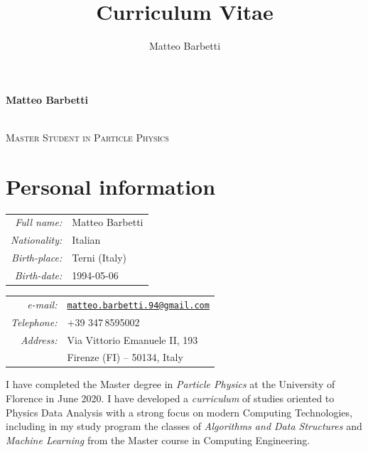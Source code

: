 \documentclass[a4, 11pt]{report}
\author{Matteo Barbetti}
\title{Curriculum Vitae}
\newcommand{\mail}[1]{\href{mailto:#1}{\texttt{#1}}}
\begin{document}
    \begin{center}
        \begin{Large}
            \textbf{Matteo Barbetti}
        \end{Large}\\[1mm]
        \textsc{Master Student in Particle Physics}
    \end{center}
    
    \vskip 3mm
    
    \section*{Personal information}
        \begin{minipage}{0.45\textwidth}
            \begin{tabular}{rl}
                \textit{Full name:}   & Matteo Barbetti\\
                \textit{Nationality:} & {Italian}\\
                \textit{Birth-place:} & {Terni (Italy)}\\
                \textit{Birth-date:}  & {1994-05-06}\\          
            \end{tabular}
        \end{minipage}
        \hfill
        \begin{minipage}{0.5\textwidth}
            \begin{tabular}{rl}
                \textit{e-mail:}      & \mail{matteo.barbetti.94@gmail.com}\\
                \textit{Telephone:}   & +39\,\,347\,8595002\\
                \textit{Address:}     & Via Vittorio Emanuele II, 193\\
                                      & Firenze (FI) -- 50134, Italy\\
            \end{tabular}
        \end{minipage}

    \vskip 9mm

    \noindent
    I have completed the Master degree in \emph{Particle Physics} at the University of Florence in June 2020. I have developed a \emph{curriculum} of studies oriented to Physics Data Analysis with a strong focus on modern Computing Technologies, including in my study program the classes of \emph{Algorithms and Data Structures} and \emph{Machine Learning} from the Master course in Computing Engineering. 
\end{document}
